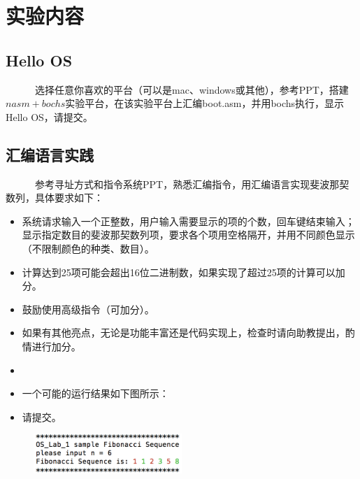 \documentclass[a4paper]{article}
\title{\Huge \heiti{操作系统实验（一）}}
\author{\lishu{南京大学软件学院}}
\date{\normalsize 2015.3}
\begin{document}
\maketitle

\renewcommand{\abstractname}{实验重点}

\begin{abstract}
本次作业重点在于熟悉掌握：8086寻址方式和指令系统，主程序和子程序的参数传递以及$nasm+bochs$实验平台的搭建和使用
\end{abstract}

\section{实验内容}
\subsection{Hello OS}
~~~~~~选择任意你喜欢的平台（可以是mac、windows或其他），参考PPT，搭建$nasm+bochs$实验平台，在该实验平台上汇编boot.asm，并用bochs执行，显示Hello OS，请提交\underline{}。
\subsection{汇编语言实践}
~~~~~~参考寻址方式和指令系统PPT，熟悉汇编指令，用汇编语言实现斐波那契数列，具体要求如下：
\begin{itemize}
	\item 系统请求输入一个正整数，用户输入需要显示的项的个数，回车键结束输入； 显示指定数目的斐波那契数列项，要求各个项用空格隔开，并用不同颜色显示（不限制颜色的种类、数目）。
	\item 计算达到25项可能会超出16位二进制数，如果实现了超过25项的计算可以加分。
	\item 鼓励使用高级指令（可加分）。
	\item 如果有其他亮点，无论是功能丰富还是代码实现上，检查时请向助教提出，酌情进行加分。
	\item {\color{red}{注意本次实验要求在linux/mac/win系统上面完成，而不是在bochs内。}}
	\item 一个可能的运行结果如下图所示：
	\item 请提交\underline{}。	
	\end{itemize}
\begin{figure}
\centering
\includegraphics[width=0.5\textwidth]{sample.png}
\end{figure}
\end{document}
